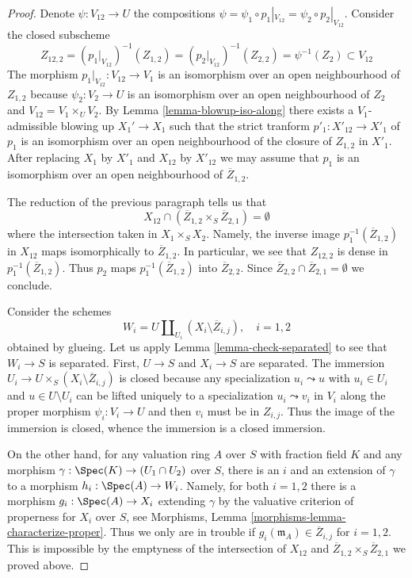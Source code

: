 \begin{proof}
\medskip\noindent
Denote $\psi : V_{12} \to U$ the compositions
$\psi = \psi_1 \circ p_1|_{V_{12}} = \psi_2 \circ p_2|_{V_{12}}$.
Consider the closed subscheme
$$
Z_{12, 2} =
(p_1|_{V_{12}})^{-1}(Z_{1, 2}) =
(p_2|_{V_{12}})^{-1}(Z_{2, 2}) =
\psi^{-1}(Z_2) \subset V_{12}
$$
The morphism $p_1|_{V_{12}} : V_{12} \to V_1$ is an isomorphism
over an open neighbourhood of $Z_{1, 2}$ because $\psi_2 : V_2 \to U$
is an isomorphism over an open neighbourhood of $Z_2$ and
$V_{12} = V_1 \times_U V_2$.
By Lemma \ref{lemma-blowup-iso-along}
there exists a $V_1$-admissible blowing up $X_1' \to X_1$
such that the strict tranform $p'_1 : X'_{12} \to X'_1$
of $p_1$ is an isomorphism over an open neighbourhood of
the closure of $Z_{1, 2}$ in $X'_1$.
After replacing $X_1$ by $X'_1$ and $X_{12}$ by $X'_{12}$
we may assume that $p_1$ is an isomorphism over an open
neighbourhood of $\overline{Z}_{1, 2}$.

\medskip\noindent
The reduction of the previous paragraph tells us that
$$
X_{12} \cap (\overline{Z}_{1, 2} \times_S \overline{Z}_{2, 1}) = \emptyset
$$
where the intersection taken in $X_1 \times_S X_2$. Namely, the inverse
image $p_1^{-1}(\overline{Z}_{1, 2})$ in $X_{12}$ maps isomorphically
to $\overline{Z}_{1, 2}$. In particular, we see that $Z_{12, 2}$
is dense in $p_1^{-1}(\overline{Z}_{1, 2})$. Thus $p_2$ maps
$p_1^{-1}(\overline{Z}_{1, 2})$ into $\overline{Z}_{2, 2}$.
Since $\overline{Z}_{2, 2} \cap \overline{Z}_{2, 1} = \emptyset$
we conclude.

\medskip\noindent
Consider the schemes
$$
W_i = U \coprod\nolimits_{U_i} (X_i \setminus \overline{Z}_{i, j}),
\quad i = 1, 2
$$
obtained by glueing. Let us apply Lemma \ref{lemma-check-separated}
to see that $W_i \to S$ is separated. First,
$U \to S$ and $X_i \to S$ are separated. The immersion
$U_i \to U \times_S (X_i \setminus \overline{Z}_{i, j})$
is closed because any specialization $u_i \leadsto u$
with $u_i \in U_i$ and $u \in U \setminus U_i$
can be lifted uniquely to a specialization
$u_i \leadsto v_i$ in $V_i$ along the proper morphism
$\psi_i : V_i \to U$ and then $v_i$ must be in $Z_{i, j}$.
Thus the image of the immersion is closed, whence the immersion
is a closed immersion.

\medskip\noindent
On the other hand, for any valuation ring $A$ over $S$ with fraction field $K$
and any morphism $\gamma : \Spec(K) \to (U_1 \cap U_2)$ over $S$, there
is an $i$ and an extension of $\gamma$ to a morphism $h_i : \Spec(A) \to W_i$.
Namely, for both $i = 1, 2$ there is a morphism
$g_i : \Spec(A) \to X_i$ extending $\gamma$ by the
valuative criterion of properness for $X_i$ over $S$, see
Morphisms, Lemma \ref{morphisms-lemma-characterize-proper}.
Thus we only are in trouble
if $g_i(\mathfrak m_A) \in \overline{Z}_{i, j}$ for $i = 1, 2$. This is
impossible by the emptyness of the intersection of $X_{12}$ and
$\overline{Z}_{1, 2} \times_S \overline{Z}_{2, 1}$ we proved above.


\end{proof}
